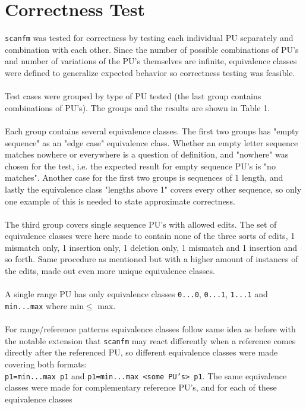 \documentclass[12pt]{article}
\newcommand{\sfm}{\texttt{scanfm} }
\newcommand{\pu}{PU }
\newcommand{\pus}{PU's }
\begin{document}
\section{Correctness Test}
\sfm was tested for correctness by testing each individual \pu separately and combination with each other.
Since the number of possible combinations of \pus and number of variations of the \pus themselves are infinite,
equivalence classes were defined to generalize expected behavior so correctness testing was feasible. \\ \\
Test cases were grouped by type of \pu tested (the last group contains combinations of PU's). The
groups and the results are shown in Table 1. \\ \\
Each group contains several equivalence classes. The first two groups has "empty sequence" as an "edge case" 
equivalence class. Whether an empty letter sequence matches nowhere or everywhere is a question of definition,
and "nowhere" was chosen for the test, i.e. the expected result for empty sequence \pus is "no matches".
Another case for the first two groups is sequences of 1 length, and lastly the equivalence class "lengths above 1" covers
every other sequence, so only one example of this is needed to state approximate correctness. \\ \\
The third group covers single sequence \pus with allowed edits. The set of equivalence classes were here made to
contain none of the three sorts of edits, 1 mismatch only, 1 insertion only, 1 deletion only, 1 mismatch and 1 insertion
and so forth. Same procedure as mentioned but with a higher amount of instances of the edits, made out even
more unique equivalence classes. \\ \\
A single range \pu has only equivalence classes \texttt{0...0}, \texttt{0...1}, \texttt{1...1} and \texttt{min...max}
where min$\leq$ max. \\ \\
For range/reference patterns equivalence classes follow same idea as before with the notable extension that
\sfm may react differently when a reference comes directly after the referenced PU, so different equivalence classes
were made covering both formats: \\\texttt{p1=min...max p1} and \texttt{p1=min...max <some PU's> p1}.
The same equivalence classes were made for complementary reference PU's, and for each of these equivalence classes
\end{document}
